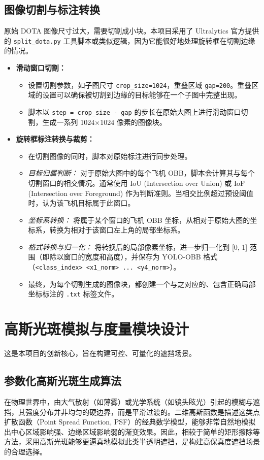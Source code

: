 \documentclass[12pt, a4paper]{report}
\begin{document}
\subsection{图像切割与标注转换}
原始 DOTA 图像尺寸过大，需要切割成小块。本项目采用了 Ultralytics 官方提供的 \texttt{split\_dota.py} 工具脚本或类似逻辑，因为它能很好地处理旋转框在切割边缘的情况。
\begin{itemize}
    \item \textbf{滑动窗口切割：}
    \begin{itemize}
        \item 设置切割参数，如子图尺寸 \texttt{crop\_size=1024}，重叠区域 \texttt{gap=200}。重叠区域的设置可以确保被切割到边缘的目标能够在一个子图中完整出现。
        \item 脚本以 \texttt{step = crop\_size - gap} 的步长在原始大图上进行滑动窗口切割，生成一系列 1024×1024 像素的图像块。
    \end{itemize}
    \item \textbf{旋转框标注转换与裁剪：}
    \begin{itemize}
        \item 在切割图像的同时，脚本对原始标注进行同步处理。
        \item \textit{目标归属判断：} 对于原始大图中的每个飞机 OBB，脚本会计算其与每个切割窗口的相交情况。通常使用 IoU (Intersection over Union) 或 IoF (Intersection over Foreground) 作为判断准则。当相交比例超过预设阈值时，认为该飞机目标属于此窗口。
        \item \textit{坐标系转换：} 将属于某个窗口的飞机 OBB 坐标，从相对于原始大图的坐标系，转换为相对于该窗口左上角的局部坐标系。
        \item \textit{格式转换与归一化：} 将转换后的局部像素坐标，进一步归一化到 [0, 1] 范围（即除以窗口的宽度和高度），并保存为 YOLO-OBB 格式（\texttt{<class\_index> <x1\_norm> ... <y4\_norm>}）。
        \item 最终，为每个切割生成的图像块，都创建一个与之对应的、包含正确局部坐标标注的 \texttt{.txt} 标签文件。
    \end{itemize}
\end{itemize}

\section{高斯光斑模拟与度量模块设计}
这是本项目的创新核心，旨在构建可控、可量化的遮挡场景。

\subsection{参数化高斯光斑生成算法}
在物理世界中，由大气散射（如薄雾）或光学系统（如镜头眩光）引起的模糊与遮挡，其强度分布并非均匀的硬边界，而是平滑过渡的。二维高斯函数是描述这类点扩散函数（Point Spread Function, PSF）的经典数学模型，能够非常自然地模拟出中心区域影响强、边缘区域影响弱的渐变效果。因此，相较于简单的矩形擦除等方法，采用高斯光斑能够更逼真地模拟此类半透明遮挡，是构建高保真度遮挡场景的合理选择。
\end{document}
